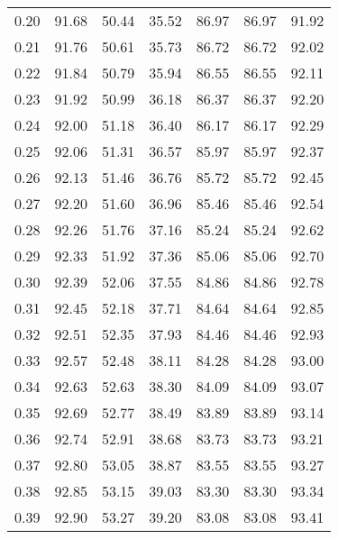 \begin{tabular}{|c|c|c|c|c|c|c|}
      0.20 &     91.68 &     50.44 &      35.52 &   86.97 &      86.97 &         91.92 \\
      0.21 &     91.76 &     50.61 &      35.73 &   86.72 &      86.72 &         92.02 \\
      0.22 &     91.84 &     50.79 &      35.94 &   86.55 &      86.55 &         92.11 \\
      0.23 &     91.92 &     50.99 &      36.18 &   86.37 &      86.37 &         92.20 \\
      0.24 &     92.00 &     51.18 &      36.40 &   86.17 &      86.17 &         92.29 \\
      0.25 &     92.06 &     51.31 &      36.57 &   85.97 &      85.97 &         92.37 \\
      0.26 &     92.13 &     51.46 &      36.76 &   85.72 &      85.72 &         92.45 \\
      0.27 &     92.20 &     51.60 &      36.96 &   85.46 &      85.46 &         92.54 \\
      0.28 &     92.26 &     51.76 &      37.16 &   85.24 &      85.24 &         92.62 \\
      0.29 &     92.33 &     51.92 &      37.36 &   85.06 &      85.06 &         92.70 \\
      0.30 &     92.39 &     52.06 &      37.55 &   84.86 &      84.86 &         92.78 \\
      0.31 &     92.45 &     52.18 &      37.71 &   84.64 &      84.64 &         92.85 \\
      0.32 &     92.51 &     52.35 &      37.93 &   84.46 &      84.46 &         92.93 \\
      0.33 &     92.57 &     52.48 &      38.11 &   84.28 &      84.28 &         93.00 \\
      0.34 &     92.63 &     52.63 &      38.30 &   84.09 &      84.09 &         93.07 \\
      0.35 &     92.69 &     52.77 &      38.49 &   83.89 &      83.89 &         93.14 \\
      0.36 &     92.74 &     52.91 &      38.68 &   83.73 &      83.73 &         93.21 \\
      0.37 &     92.80 &     53.05 &      38.87 &   83.55 &      83.55 &         93.27 \\
      0.38 &     92.85 &     53.15 &      39.03 &   83.30 &      83.30 &         93.34 \\
      0.39 &     92.90 &     53.27 &      39.20 &   83.08 &      83.08 &         93.41 \\

\end{tabular}
